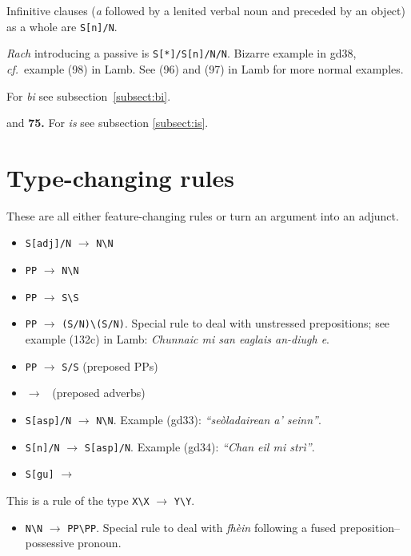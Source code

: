 \documentclass[a4paper]{article}
\begin{document}
 Infinitive clauses (\textit{a} followed by a lenited verbal noun and preceded by an object) as a whole are \texttt{S[n]/N}.

 \textit{Rach} introducing a passive is \texttt{S[*]/S[n]/N/N}.
Bizarre example in gd38, \textit{cf.}~example (98) in Lamb.
See (96) and (97) in Lamb for more normal examples.

 For \textit{bi} see subsection~\ref{subsect:bi}.

 and {\bf 75.} For \textit{is} see subsection \ref{subsect:is}.


\section{Type-changing rules\label{section:typechanging}}

These are all either feature-changing rules or turn an argument into an adjunct.

\begin{itemize}
\item \texttt{S[adj]/N} $\rightarrow$ \texttt{N\textbackslash N}
\item \texttt{PP} $\rightarrow$ \texttt{N\textbackslash N}
\item \texttt{PP} $\rightarrow$ \texttt{S\textbackslash S}
\item \texttt{PP} $\rightarrow$ \texttt{(S/N)\textbackslash(S/N)}.
Special rule to deal with unstressed prepositions; see example (132c) in Lamb: \textit{Chunnaic mi san eaglais an-diugh e}.
\item \texttt{PP} $\rightarrow$ \texttt{S/S} (preposed PPs)
\item \SbNsSbN $\rightarrow$ \SsS\ (preposed adverbs)
\item \texttt{S[asp]/N} $\rightarrow$ \texttt{N\textbackslash N}.
Example (gd33): \textit{``se\`oladairean a' seinn''}.
\item \texttt{S[n]/N} $\rightarrow$ \texttt{S[asp]/N}.
Example (gd34): \textit{``Chan eil mi str\`i''}.
\item \texttt{S[gu]} $\rightarrow$ \NbN
\end{itemize}

This is a rule of the type \texttt{X\textbackslash X} $\rightarrow$ \texttt{Y\textbackslash Y}.

\begin{itemize}
\item \texttt{N\textbackslash N} $\rightarrow$ \texttt{PP\textbackslash PP}.
Special rule to deal with \textit{fh\`ein} following a fused preposition--possessive pronoun.
\end{itemize}
\end{document}
